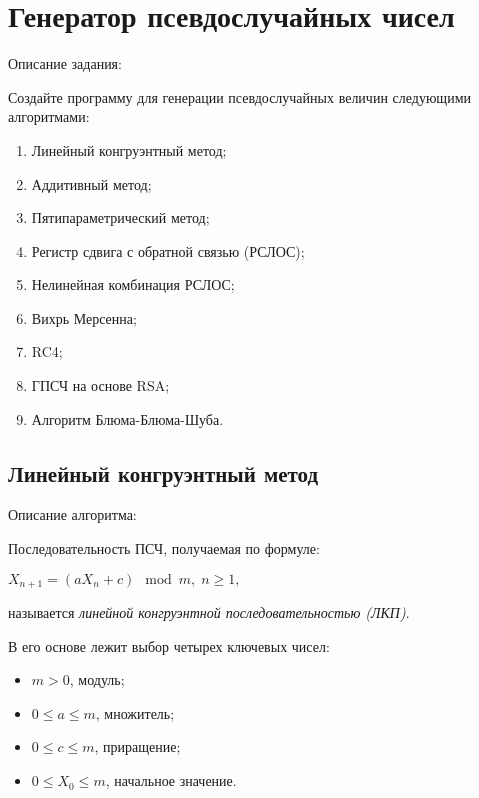 \documentclass[bachelor, och, coursework]{shiza}
\begin{document}
	
	
		
	\section{Генератор псевдослучайных чисел}
	
	Описание задания:
	
	Создайте программу для генерации псевдослучайных величин следующими алгоритмами:
	\begin{enumerate}
		\item Линейный конгруэнтный метод;
		\item Аддитивный метод;
		\item Пятипараметрический метод;
		\item Регистр сдвига с обратной связью (РСЛОС);
		\item Нелинейная комбинация РСЛОС;
		\item Вихрь Мерсенна;
		\item RC4;
		\item ГПСЧ на основе RSA;
		\item Алгоритм Блюма-Блюма-Шуба.
	\end{enumerate}
	
	
	\subsection{Линейный конгруэнтный метод}
	
	Описание алгоритма:
	
	Последовательность ПСЧ, получаемая по формуле:
	\begin{center}
		$X_{n + 1} = (aX_n + c) \mod m, \; n \geq 1,$
	\end{center}
	называется \textit{линейной конгруэнтной последовательностью (ЛКП)}.
	
	В его основе лежит выбор четырех ключевых чисел:
	\begin{itemize}
		\item $m > 0$, модуль;
		\item $0 \leq a \leq m$, множитель;
		\item $0 \leq c \leq m$, приращение;
		\item $0 \leq X_0 \leq m$, начальное значение.
	\end{itemize}
\end{document}
